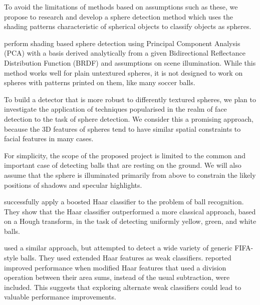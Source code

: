 \documentclass[11pt]{scrartcl}
\begin{document}
{        %

        To avoid the limitations of methods based on assumptions such as
        these, we propose to research and develop a sphere detection method which uses
        the shading patterns characteristic of spherical objects to classify
        objects as spheres.

        \citet{nillius2008shading} perform shading based sphere detection
        using Principal Component Analysis (PCA) with a basis derived analytically from a given Bidirectional Reflectance Distribution Function (BRDF) and assumptions
        on scene illumination. While this method works well for plain untextured spheres, it is
        not designed to work on spheres with patterns printed on them, like many
        soccer balls.

        To build a detector that is more robust to differently textured
        spheres, we plan to investigate the application of techniques
        popularised in the realm of face detection to the task of sphere
        detection. We consider this a promising approach, because the 3D
        features of spheres tend to have similar spatial constraints to facial
        features in many cases.

        For simplicity, the scope of the proposed project is limited to the
        common and important case of detecting balls that are resting on the
        ground. We will also assume that the sphere is illuminated primarily
        from above to constrain the likely positions of shadows and specular
        highlights.

        \citet{masselli2013haar} successfully apply a boosted Haar classifier
        \citep{viola2001robust} to the problem of ball recognition. They show
        that the Haar classifier outperformed a more classical approach, based on a
        Hough transform, in the task of detecting uniformly yellow, green, and white
        balls.

        \citet{zhang2013novel} used a similar approach, but attempted to
        detect a wide variety of generic FIFA-style balls. They used extended
        Haar features \citep{Lienhart2002extended} as weak classifiers.
        \citeauthor{zhang2013novel} reported improved performance when modified Haar
        features that used a division operation between their area sums, instead of
        the usual subtraction, were included. This suggests that exploring alternate
        weak classifiers could lead to valuable performance improvements.

}
\end{document}
